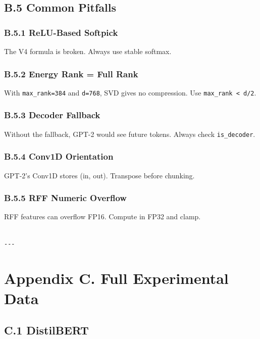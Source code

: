 \subsection{B.5 Common Pitfalls}

\subsubsection{B.5.1 ReLU-Based Softpick}

The V4 formula is broken. Always use stable softmax.

\subsubsection{B.5.2 Energy Rank = Full Rank}

With \texttt{max\_rank=384} and \texttt{d=768}, SVD gives no compression. Use 
\texttt{max\_rank < d/2}.

\subsubsection{B.5.3 Decoder Fallback}

Without the fallback, GPT-2 would see future tokens. Always check 
\texttt{is\_decoder}.

\subsubsection{B.5.4 Conv1D Orientation}

GPT-2's Conv1D stores (in, out). Transpose before chunking.

\subsubsection{B.5.5 RFF Numeric Overflow}

RFF features can overflow FP16. Compute in FP32 and clamp.
\begin{lstlisting}

---
\end{lstlisting}

\section{Appendix C. Full Experimental Data}

\subsection{C.1 DistilBERT}

